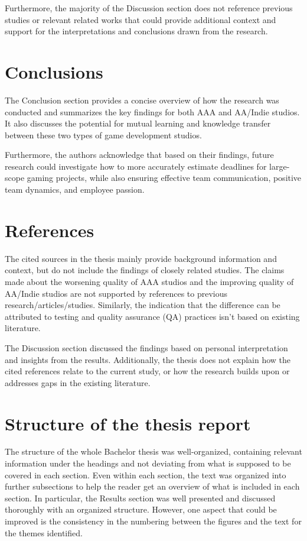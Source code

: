 \documentclass[conference]{IEEEtran}
\begin{document}
Furthermore, the majority of the Discussion section does not reference previous studies or relevant related works that could provide additional context and support for the interpretations and conclusions drawn from the research.

\section{Conclusions}
The Conclusion section provides a concise overview of how the research was conducted and summarizes the key findings for both AAA and AA/Indie studios. It also discusses the potential for mutual learning and knowledge transfer between these two types of game development studios.

Furthermore, the authors acknowledge that based on their findings, future research could investigate how to more accurately estimate deadlines for large-scope gaming projects, while also ensuring effective team communication, positive team dynamics, and employee passion.


\section{References}
The cited sources in the thesis mainly provide background information and context, but do not include the findings of closely related studies. The claims made about the worsening quality of AAA studios and the improving quality of AA/Indie studios are not supported by references to previous research/articles/studies. Similarly, the indication that the difference can be attributed to testing and quality assurance (QA) practices isn't based on existing literature.

The Discussion section discussed the findings based on personal interpretation and insights from the results. Additionally, the thesis does not explain how the cited references relate to the current study, or how the research builds upon or addresses gaps in the existing literature.


\section{Structure of the thesis report}
The structure of the whole Bachelor thesis was well-organized, containing relevant information under the headings and not deviating from what is supposed to be covered in each section. Even within each section, the text was organized into further subsections to help the reader get an overview of what is included in each section. In particular, the Results section was well presented and discussed thoroughly with an organized structure. However, one aspect that could be improved is the consistency in the numbering between the figures and the text for the themes identified.
\end{document}
